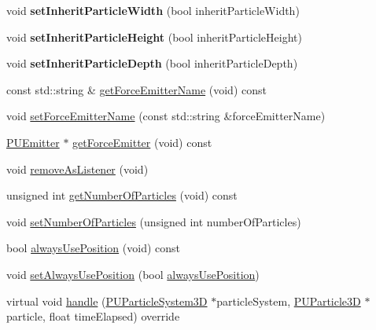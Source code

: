 \begin{DoxyCompactItemize}
void {\bfseries set\+Inherit\+Particle\+Width} (bool inherit\+Particle\+Width)
\item 
\mbox{\label{classPUDoPlacementParticleEventHandler_a831eb45f0fd70ea5ec3fd5c255f9be76}} 
void {\bfseries set\+Inherit\+Particle\+Height} (bool inherit\+Particle\+Height)
\item 
\mbox{\label{classPUDoPlacementParticleEventHandler_adc98246958c411e27051834f67be777d}} 
void {\bfseries set\+Inherit\+Particle\+Depth} (bool inherit\+Particle\+Depth)
\item 
const std\+::string \& \hyperlink{classPUDoPlacementParticleEventHandler_ab56e12fe41572adc447449f72a87b774}{get\+Force\+Emitter\+Name} (void) const
\item 
void \hyperlink{classPUDoPlacementParticleEventHandler_a3f2f070e0ebaeb4f15f8f8f9bf4c8237}{set\+Force\+Emitter\+Name} (const std\+::string \&force\+Emitter\+Name)
\item 
\hyperlink{classPUEmitter}{P\+U\+Emitter} $\ast$ \hyperlink{classPUDoPlacementParticleEventHandler_af78c199e7377b8ebc79940b8d4af2cf8}{get\+Force\+Emitter} (void) const
\item 
void \hyperlink{classPUDoPlacementParticleEventHandler_a2d8d0acd323398efa7ff99f64a604c5f}{remove\+As\+Listener} (void)
\item 
unsigned int \hyperlink{classPUDoPlacementParticleEventHandler_a44a399cb47ba2149737eab0b65e45f1f}{get\+Number\+Of\+Particles} (void) const
\item 
void \hyperlink{classPUDoPlacementParticleEventHandler_a22b2de04e22c880c32049f2b32838369}{set\+Number\+Of\+Particles} (unsigned int number\+Of\+Particles)
\item 
bool \hyperlink{classPUDoPlacementParticleEventHandler_a95a5ae60fc370645d6aae741235f03f0}{always\+Use\+Position} (void) const
\item 
void \hyperlink{classPUDoPlacementParticleEventHandler_a51a2f5293ed320aff56a71749e9d83a0}{set\+Always\+Use\+Position} (bool \hyperlink{classPUDoPlacementParticleEventHandler_a95a5ae60fc370645d6aae741235f03f0}{always\+Use\+Position})
\item 
virtual void \hyperlink{classPUDoPlacementParticleEventHandler_a315d038959b01349560a1e222e3bcfb9}{handle} (\hyperlink{classPUParticleSystem3D}{P\+U\+Particle\+System3D} $\ast$particle\+System, \hyperlink{structPUParticle3D}{P\+U\+Particle3D} $\ast$particle, float time\+Elapsed) override

\end{DoxyCompactItemize}
